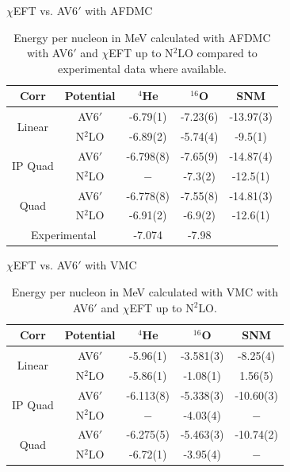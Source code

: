 \documentclass{beamer}
\begin{document}
\begin{frame}{$\chi$EFT vs. AV6$'$ with AFDMC}
\begin{table}[htb]
\centering
\caption[]{Energy per nucleon in MeV calculated with AFDMC with AV6$'$ and $\chi$EFT up to N$^2$LO compared to experimental data where available.}
\begin{tabular}{ccccc}
\hline\hline
Corr  & Potential  & $^4$He   & $^{16}$O  & SNM \\
\hline
\multirow{2}{*}{Linear} & AV6$'$    & -6.79(1)  & -7.23(6)  & -13.97(3) \\
                        & N$^2$LO   & -6.89(2)  & -5.74(4)  & -9.5(1)   \\
\hline
\multirow{2}{*}{IP Quad}& AV6$'$    & -6.798(8) & -7.65(9)  & -14.87(4) \\
                        & N$^2$LO   & $-$       & -7.3(2)   & -12.5(1)  \\
\hline
\multirow{2}{*}{Quad}   & AV6$'$    & -6.778(8) & -7.55(8)  & -14.81(3) \\
                        & N$^2$LO   & -6.91(2)  & -6.9(2)   & -12.6(1)  \\
\hline\hline
\multicolumn{2}{c}{\multirow{2}{*}{Experimental}}  & \multirow{2}{*}{-7.074} & \multirow{2}{*}{-7.98}   &  \\
                        &           &           &           & \\
\hline\hline
\end{tabular}
\end{table}
\end{frame}

\begin{frame}{$\chi$EFT vs. AV6$'$ with VMC}
\begin{table}[htb]
\centering
\caption[]{Energy per nucleon in MeV calculated with VMC with AV6$'$ and $\chi$EFT up to N$^2$LO.}
\begin{tabular}{ccccc}
\hline\hline
Corr  & Potential  & $^4$He   & $^{16}$O  & SNM \\
\hline
\multirow{2}{*}{Linear} & AV6$'$    & -5.96(1)  & -3.581(3) & -8.25(4)  \\
                        & N$^2$LO   & -5.86(1)  & -1.08(1)  &  1.56(5)  \\
\hline
\multirow{2}{*}{IP Quad}& AV6$'$    & -6.113(8) & -5.338(3) & -10.60(3) \\
                        & N$^2$LO   & $-$       & -4.03(4)  & $-$       \\
\hline
\multirow{2}{*}{Quad}   & AV6$'$    & -6.275(5) & -5.463(3) & -10.74(2) \\
                        & N$^2$LO   & -6.72(1)  & -3.95(4)  & $-$       \\
\hline\hline
\end{tabular}
\end{table}
\end{frame}
\end{document}
